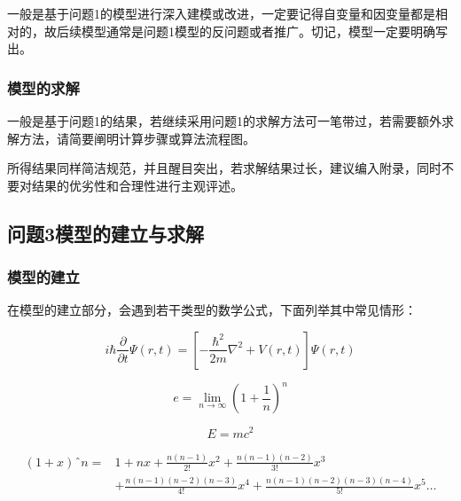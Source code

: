 \documentclass[12pt,utf8]{article}
\begin{document}
一般是基于问题1的模型进行深入建模或改进，一定要记得自变量和因变量都是相对的，故后续模型通常是问题1模型的反问题或者推广。切记，模型一定要明确写出。


\subsubsection{模型的求解}

一般是基于问题1的结果，若继续采用问题1的求解方法可一笔带过，若需要额外求解方法，请简要阐明计算步骤或算法流程图。

所得结果同样简洁规范，并且醒目突出，若求解结果过长，建议编入附录，同时不要对结果的优劣性和合理性进行主观评述。

\subsection{问题3模型的建立与求解}

\subsubsection{模型的建立}
在模型的建立部分，会遇到若干类型的数学公式，下面列举其中常见情形：

\begin{equation}\label{eq1}
  i\hbar\frac{\partial}{\partial t} \Psi(r,t)  = \left[
  -\frac{\hbar^2}{2m}\nabla^2+V(r,t) \right]\Psi(r,t) 
\end{equation}

\begin{equation*}
  e=\lim_{n\to\infty} \left(1+\frac{1}{n}\right)^n
\end{equation*}

\begin{equation}
   E = mc^2  \tag{MEE}
\end{equation}


\begin{equation}
\begin{aligned}
   \left(1+x\right)ˆn  =&  1 + nx + \frac{n\left(n-1\right)}{2!}x^2 
     + \frac{n\left(n-1\right)\left(n-2\right)}{3!}x^3 
     \\& + \frac{n\left(n-1\right)\left(n-2\right)\left(n-3\right)}{4!}x^4 
   +  \frac{n\left(n-1\right)\left(n-2\right)\left(n-3\right)\left(n-4\right)}{5!}x^5 \ldots
\end{aligned}
\end{equation}
\end{document}

